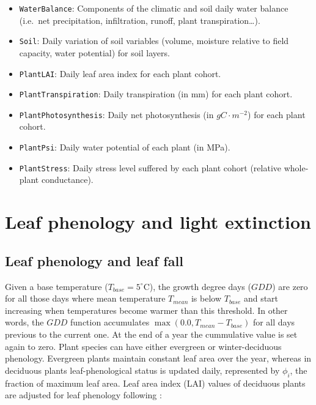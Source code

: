 \documentclass[]{book}
\providecommand{\tightlist}{%
  \setlength{\itemsep}{0pt}\setlength{\parskip}{0pt}}
\begin{document}
\begin{itemize}
\tightlist
\item
  \texttt{WaterBalance}: Components of the climatic and soil daily water
  balance (i.e.~net precipitation, infiltration, runoff, plant
  transpiration\ldots{}).
\item
  \texttt{Soil}: Daily variation of soil variables (volume, moisture
  relative to field capacity, water potential) for soil layers.
\item
  \texttt{PlantLAI}: Daily leaf area index for each plant cohort.
\item
  \texttt{PlantTranspiration}: Daily transpiration (in mm) for each
  plant cohort.
\item
  \texttt{PlantPhotosynthesis}: Daily net photosynthesis (in
  \(g C \cdot m^{-2}\)) for each plant cohort.
\item
  \texttt{PlantPsi}: Daily water potential of each plant (in MPa).
\item
  \texttt{PlantStress}: Daily stress level suffered by each plant cohort
  (relative whole-plant conductance).
\end{itemize}

\chapter{Leaf phenology and light
extinction}\label{leaf-phenology-and-light-extinction}

\section{Leaf phenology and leaf fall}\label{leafphenology}

Given a base temperature (\(T_{base} = 5^{\circ} \mathrm{C}\)), the
growth degree days (\(GDD\)) are zero for all those days where mean
temperature \(T_{mean}\) is below \(T_{base}\) and start increasing when
temperatures become warmer than this threshold. In other words, the
\(GDD\) function accumulates \(\max(0.0, T_{mean} - T_{base})\) for all
days previous to the current one. At the end of a year the cummulative
value is set again to zero. Plant species can have either evergreen or
winter-deciduous phenology. Evergreen plants maintain constant leaf area
over the year, whereas in deciduous plants leaf-phenological status is
updated daily, represented by \(\phi_i\), the fraction of maximum leaf
area. Leaf area index (LAI) values of deciduous plants are adjusted for
leaf phenology following \citep{Prentice1993, Sitch2003}:
\end{document}
